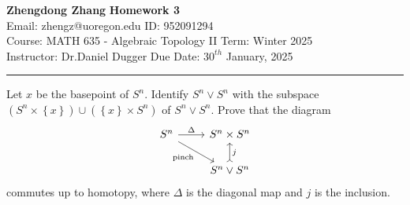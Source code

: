 \documentclass[a4paper, 12pt]{article}
\begin{document}
\noindent
\large\textbf{Zhengdong Zhang} \hfill \textbf{Homework 3}   \\
Email: zhengz@uoregon.edu \hfill ID: 952091294 \\
\normalsize Course: MATH 635 - Algebraic Topology II \hfill Term: Winter 2025\\
Instructor: Dr.Daniel Dugger \hfill Due Date: $30^{th}$ January, 2025 \\
\noindent\rule{7in}{2.8pt}

\begin{problem}{1}
Let \(x\) be the basepoint of \(S^n\). Identify \(S^n\vee S^n\) with the subspace \((S^n\times \left\{ x \right\})\cup (\left\{ x \right\}\times S^n)\) of 
\(S^n\vee S^n\). Prove that the diagram 
\[\begin{tikzcd}
	{S^n} & {S^n\times S^n} \\
	& {S^n\vee S^n}
	\arrow["\Delta", from=1-1, to=1-2]
	\arrow["{\text{pinch}}"', from=1-1, to=2-2]
	\arrow["j"', tail, from=2-2, to=1-2]
\end{tikzcd}\]
commutes up to homotopy, where \(\Delta\) is the diagonal map and \(j\) is the inclusion. 
\end{problem}
\end{document}
